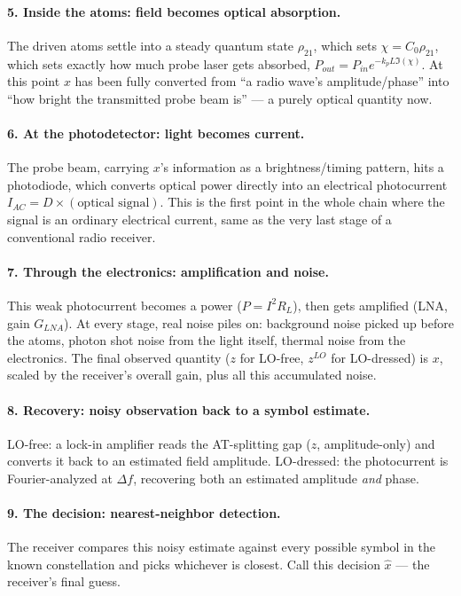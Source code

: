 \documentclass[11pt]{article}
\begin{document}
\paragraph{5. Inside the atoms: field becomes optical absorption.}
The driven atoms settle into a steady quantum state $\rho_{21}$, which sets $\chi=C_0\rho_{21}$, which sets exactly how much probe laser gets absorbed, $P_{out}=P_{in}e^{-k_pL\Im(\chi)}$. At this point $x$ has been fully converted from ``a radio wave's amplitude/phase'' into ``how bright the transmitted probe beam is'' --- a purely optical quantity now.

\paragraph{6. At the photodetector: light becomes current.}
The probe beam, carrying $x$'s information as a brightness/timing pattern, hits a photodiode, which converts optical power directly into an electrical photocurrent $I_{AC}=D\times(\text{optical signal})$. This is the first point in the whole chain where the signal is an ordinary electrical current, same as the very last stage of a conventional radio receiver.

\paragraph{7. Through the electronics: amplification and noise.}
This weak photocurrent becomes a power ($P=I^2R_L$), then gets amplified (LNA, gain $G_{LNA}$). At every stage, real noise piles on: background noise picked up before the atoms, photon shot noise from the light itself, thermal noise from the electronics. The final observed quantity ($z$ for LO-free, $z^{LO}$ for LO-dressed) is $x$, scaled by the receiver's overall gain, plus all this accumulated noise.

\paragraph{8. Recovery: noisy observation back to a symbol estimate.}
LO-free: a lock-in amplifier reads the AT-splitting gap ($z$, amplitude-only) and converts it back to an estimated field amplitude. LO-dressed: the photocurrent is Fourier-analyzed at $\Delta f$, recovering both an estimated amplitude \emph{and} phase.

\paragraph{9. The decision: nearest-neighbor detection.}
The receiver compares this noisy estimate against every possible symbol in the known constellation and picks whichever is closest. Call this decision $\hat x$ --- the receiver's final guess.
\end{document}
